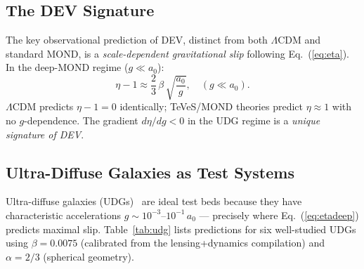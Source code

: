 \documentclass[aps,prd,twocolumn,showpacs,superscriptaddress]{revtex4-2}
\newcommand{\aO}{a_0}
\newcommand{\LCDM}{$\Lambda$CDM}
\begin{document}
\subsection{The DEV Signature}

The key observational prediction of DEV, distinct from both
\LCDM{} and standard MOND, is a \emph{scale-dependent gravitational slip}
following Eq.~(\ref{eq:eta}).
In the deep-MOND regime ($g \ll \aO$):
\begin{equation}
  \eta - 1 \approx \frac{2}{3}\,\beta\,\sqrt{\frac{\aO}{g}},
  \quad (g \ll \aO).
  \label{eq:etadeep}
\end{equation}
\LCDM{} predicts $\eta - 1 = 0$ identically;
TeVeS/MOND theories predict $\eta \approx 1$ with no $g$-dependence.
The gradient $d\eta/dg < 0$ in the UDG regime is a
\emph{unique signature of DEV}.

\subsection{Ultra-Diffuse Galaxies as Test Systems}

Ultra-diffuse galaxies (UDGs)~\cite{vanDokkum2015} are ideal test beds
because they have characteristic accelerations
$g \sim 10^{-3}$--$10^{-1}\,\aO$ —
precisely where Eq.~(\ref{eq:etadeep}) predicts maximal slip.
Table~\ref{tab:udg} lists predictions for six well-studied UDGs using
$\beta = 0.0075$ (calibrated from the lensing+dynamics compilation)
and $\alpha = 2/3$ (spherical geometry).
\end{document}
